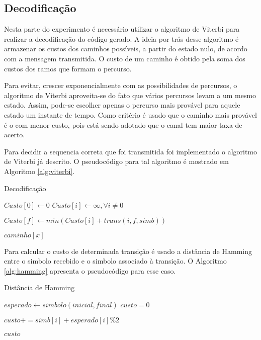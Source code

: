 \subsection{Decodificação}

Nesta parte do experimento é necessário utilizar o algoritmo de Viterbi para realizar a decodificação do código gerado. A ideia por trás desse algoritmo é armazenar os custos dos caminhos possíveis, a partir do estado nulo, de acordo com a mensagem transmitida. O custo de um caminho é obtido pela soma dos custos dos ramos que formam o percurso.

Para evitar, crescer exponencialmente com as possibilidades de percursos, o algoritmo de Viterbi aproveita-se do fato que vários percursos levam a um mesmo estado. Assim, pode-se escolher apenas o percurso mais provável para aquele estado um instante de tempo. Como critério é usado que o caminho mais provável é o com menor custo, pois está sendo adotado que o canal tem maior taxa de acerto.

Para decidir a sequencia correta que foi transmitida foi implementado o algoritmo de Viterbi já descrito. O pseudocódigo para tal algoritmo é mostrado em Algoritmo \ref{alg:viterbi}.

\begin{algorithm}[h!]
	\caption{Decodificação}
	\label{alg:viterbi}
	\begin{algorithmic}[Message]		
			\State $Custo[0] \gets 0$
			\State $Custo[i] \gets \infty, \forall i \ne 0$
			
					\State $Custo[f] \gets min(Custo[i] + trans(i, f, simb))$
				\EndFor
			\EndFor
			
			
		\Return $caminho[x]$
		\EndProcedure
	\end{algorithmic}
\end{algorithm}

Para calcular o custo de determinada transição é usado a distância de Hamming entre o simbolo recebido e o simbolo associado à transição. O Algoritmo \ref{alg:hamming} apresenta o pseudocódigo para esse caso.

\begin{algorithm}[h!]
	\caption{Distância de Hamming}
	\label{alg:hamming}
	\begin{algorithmic}[Message]		
		\State $esperado \gets simbolo(inicial, final)$
		\State $custo = 0$
		
			\State $custo += simb[i] + esperado[i] \% 2$
		\EndFor
		
		\Return $custo$
		\EndProcedure
	\end{algorithmic}
\end{algorithm}


